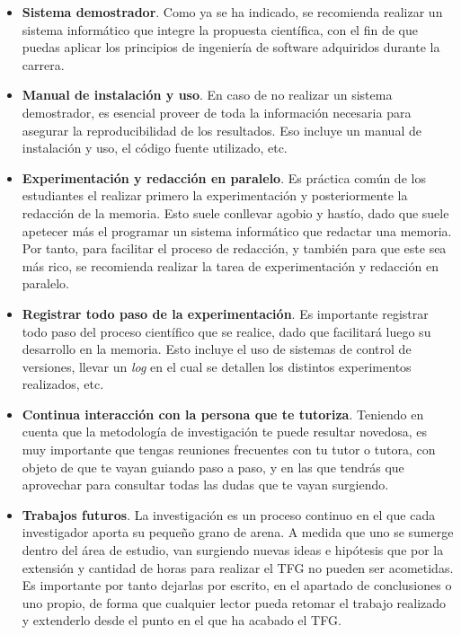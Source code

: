 \begin{itemize}
    \item \textbf{Sistema demostrador}. Como ya se ha indicado, se recomienda realizar un sistema informático que integre la propuesta científica, con el fin de que puedas aplicar los principios de ingeniería de software adquiridos durante la carrera. 
    
    \item \textbf{Manual de instalación y uso}. En caso de no realizar un sistema demostrador, es esencial proveer de toda la información necesaria para asegurar la reproducibilidad de los resultados. Eso incluye un manual de instalación y uso, el código fuente utilizado, etc.

    \item \textbf{Experimentación y redacción en paralelo}. Es práctica común de los estudiantes el realizar primero la experimentación y posteriormente la redacción de la memoria. Esto suele conllevar agobio y hastío, dado que suele apetecer más el programar un sistema informático que redactar una memoria. Por tanto, para facilitar el proceso de redacción, y también para que este sea más rico, se recomienda realizar la tarea de experimentación y redacción en paralelo.

    \item \textbf{Registrar todo paso de la experimentación}. Es importante registrar todo paso del proceso científico que se realice, dado que facilitará luego su desarrollo en la memoria. Esto incluye el uso de sistemas de control de versiones, llevar un \textit{log} en el cual se detallen los distintos experimentos realizados, etc.

    \item \textbf{Continua interacción con la persona que te tutoriza}. Teniendo en cuenta que la metodología de investigación te puede resultar novedosa, es muy importante que tengas reuniones frecuentes con tu tutor o tutora,  con objeto de que te vayan guiando paso a paso, y en las que tendrás que aprovechar para consultar todas las dudas que te vayan surgiendo.

    \item \textbf{Trabajos futuros}. La investigación es un proceso continuo en el que cada investigador aporta su pequeño grano de arena. A medida que uno se sumerge dentro del área de estudio, van surgiendo nuevas ideas e hipótesis que por la extensión y cantidad de horas para realizar el TFG no pueden ser acometidas. Es importante por tanto dejarlas por escrito, en el apartado de conclusiones o uno propio, de forma que cualquier lector pueda retomar el trabajo realizado y extenderlo desde el punto en el que ha acabado el TFG.


\end{itemize}
